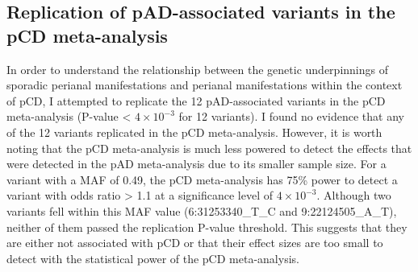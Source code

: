 \subsection{Replication of pAD-associated variants in the pCD meta-analysis}
In order to understand the relationship between the genetic underpinnings of sporadic perianal manifestations and perianal manifestations within the context of pCD, I attempted to replicate the 12 pAD-associated variants in the pCD meta-analysis (P-value < $4\times10^{-3}$ for 12 variants). I found no evidence that any of the 12 variants replicated in the pCD meta-analysis. However, it is worth noting that the pCD meta-analysis is much less powered to detect the effects that were detected in the pAD meta-analysis due to its smaller sample size. For a variant with a MAF of 0.49, the pCD meta-analysis has 75\% power to detect a variant with odds ratio > 1.1 at a significance level of $4\times10^{-3}$. Although two variants fell within this MAF value (6:31253340\_T\_C and 9:22124505\_A\_T), neither of them passed the replication P-value threshold. This suggests that they are either not associated with pCD or that their effect sizes are too small to detect with the statistical power of the pCD meta-analysis. 
